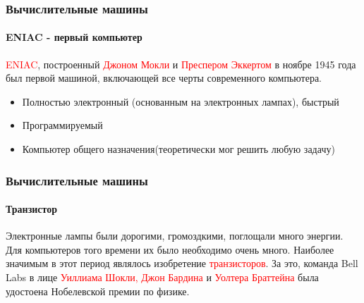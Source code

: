 \documentclass[aspectratio=169]{beamer}
\begin{document}
\begin{frame}
\frametitle{Вычислительные машины}
\framesubtitle{ENIAC - первый компьютер}
\justifying
\textcolor{red}{ENIAC}, построенный \textcolor{red}{Джоном Мокли} и \textcolor{red}{Преспером Эккертом} в ноябре 1945 года был первой машиной, включающей все черты современного компьютера.

\begin{itemize}
\item{Полностью электронный (основанным на электронных лампах), быстрый}
\item{Программируемый}
\item{Компьютер общего назначения(теоретически мог решить любую задачу)}
\end{itemize}

\begin{figure}

    \captionsetup[subfigure]{labelformat=empty}
    \centering
\end{figure}
\end{frame}

\begin{frame}
\frametitle{Вычислительные машины}
\framesubtitle{Транзистор}
\justifying

Электронные лампы были дорогими, громоздкими, поглощали много энергии. \newline Для компьютеров того времени их было необходимо очень много.\newline\newline
Наиболее значимым в этот период являлось изобретение \textcolor{red}{транзисторов}. \newline За это, команда Bell Labs в лице \textcolor{red}{Уиллиама Шокли,  Джон Бардина} и \textcolor{red}{Уолтера Браттейна} была удостоена Нобелевской премии по физике.

\begin{figure}
    \captionsetup[subfigure]{labelformat=empty}
    \centering
\end{figure}
\end{frame}
\end{document}
